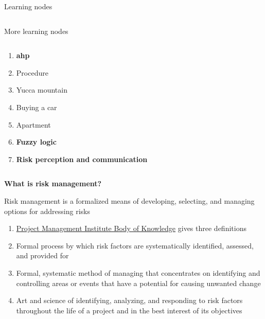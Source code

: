 \documentclass[aspectratio=1610,pdftex,dvipsnames,compress,xcolor={dvipsnames}]{beamer}
\newcommand{\acf}{\acrfull} %
\begin{document}
\begin{frame}{Learning nodes}
\begin{columns}[t]
    \end{columns}
\end{frame}


\begin{frame}{More learning nodes}
    \begin{columns}[t]

        \begin{column}{0.50\textwidth}
            \begin{enumerate}[series=outerlist,topsep=0pt,itemsep=1pt,leftmargin=*,label=(\arabic*)]
                \item[]\textbf{\acf{ahp}}
                \item[]Procedure  
                \item[]Yucca mountain
                \item[]Buying a car  
                \item[]Apartment
                    \vspace{0.10in}
                \item[]\textbf{Fuzzy logic}
                    \vspace{0.10in}
                \item[]\textbf{Risk perception and communication}
            \end{enumerate}
        \end{column}

        \begin{column}{0.50\textwidth}
        \end{column}

    \end{columns}
\end{frame}


\begin{frame}[plain]{}
    \centering\LARGE\textbf{What is risk management?}
\end{frame}


\addtocounter{framenumber}{-1}
\begin{frame}{Risk management is a formalized means of developing, selecting, and managing options for addressing risks}
    \begin{enumerate}[series=outerlist,topsep=0pt,itemsep=21pt,leftmargin=*,label=(\arabic*)]
        \item[]\href{https://www.pmi.org/pmbok-guide-standards/foundational/pmbok}{Project Management Institute Body of Knowledge} gives three definitions
        \item Formal process by which risk factors are systematically identified, assessed, and provided for
        \item Formal, systematic method of managing that concentrates on identifying and controlling areas or events that have a potential for causing unwanted change 
        \item Art and science of identifying, analyzing, and responding to risk factors throughout the life of a project and in the best interest of its objectives 
    \end{enumerate}
\end{frame}
\end{document}
